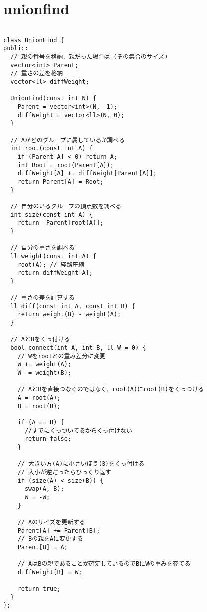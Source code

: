 \documentclass[a4j,titlepage]{jarticle} %
\begin{document}
\section{unionfind}
\color{black}
\begin{lstlisting}[caption=unionfind]

class UnionFind {
public:
  // 親の番号を格納．親だった場合は-(その集合のサイズ)
  vector<int> Parent;
  // 重さの差を格納
  vector<ll> diffWeight;

  UnionFind(const int N) {
    Parent = vector<int>(N, -1);
    diffWeight = vector<ll>(N, 0);
  }

  // Aがどのグループに属しているか調べる
  int root(const int A) {
    if (Parent[A] < 0) return A;
    int Root = root(Parent[A]);
    diffWeight[A] += diffWeight[Parent[A]];
    return Parent[A] = Root;
  }

  // 自分のいるグループの頂点数を調べる
  int size(const int A) {
    return -Parent[root(A)];
  }

  // 自分の重さを調べる
  ll weight(const int A) {
    root(A); // 経路圧縮
    return diffWeight[A];
  }

  // 重さの差を計算する
  ll diff(const int A, const int B) {
    return weight(B) - weight(A);
  }

  // AとBをくっ付ける
  bool connect(int A, int B, ll W = 0) {
    // Wをrootとの重み差分に変更
    W += weight(A);
    W -= weight(B);

    // AとBを直接つなぐのではなく、root(A)にroot(B)をくっつける
    A = root(A);
    B = root(B);

    if (A == B) {
      //すでにくっついてるからくっ付けない
      return false;
    }

    // 大きい方(A)に小さいほう(B)をくっ付ける
    // 大小が逆だったらひっくり返す
    if (size(A) < size(B)) {
      swap(A, B);
      W = -W;
    }

    // Aのサイズを更新する
    Parent[A] += Parent[B];
    // Bの親をAに変更する
    Parent[B] = A;

    // AはBの親であることが確定しているのでBにWの重みを充てる
    diffWeight[B] = W;

    return true;
  }
};

\end{lstlisting}

\color{white}
\end{document}
